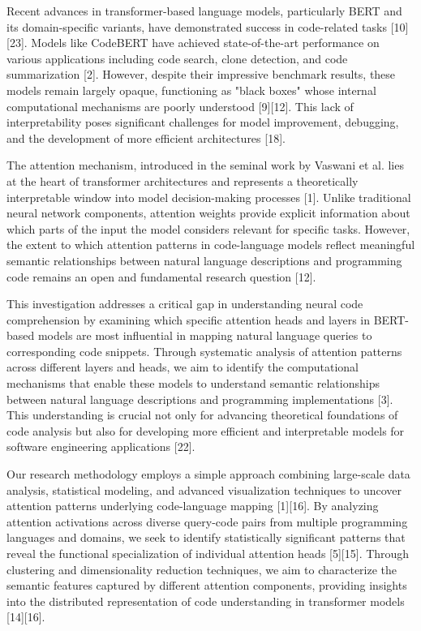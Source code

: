 \documentclass[conference]{IEEEtran}
\begin{document}
Recent advances in transformer-based language models, particularly BERT and its domain-specific variants, have demonstrated success in code-related tasks [10][23]. Models like CodeBERT have achieved state-of-the-art performance on various applications including code search, clone detection, and code summarization [2]. However, despite their impressive benchmark results, these models remain largely opaque, functioning as "black boxes" whose internal computational mechanisms are poorly understood [9][12]. This lack of interpretability poses significant challenges for model improvement, debugging, and the development of more efficient architectures [18].

The attention mechanism, introduced in the seminal work by Vaswani et al. lies at the heart of transformer architectures and represents a theoretically interpretable window into model decision-making processes [1]. Unlike traditional neural network components, attention weights provide explicit information about which parts of the input the model considers relevant for specific tasks. However, the extent to which attention patterns in code-language models reflect meaningful semantic relationships between natural language descriptions and programming code remains an open and fundamental research question [12].

This investigation addresses a critical gap in understanding neural code comprehension by examining which specific attention heads and layers in BERT-based models are most influential in mapping natural language queries to corresponding code snippets. Through systematic analysis of attention patterns across different layers and heads, we aim to identify the computational mechanisms that enable these models to understand semantic relationships between natural language descriptions and programming implementations [3]. This understanding is crucial not only for advancing theoretical foundations of code analysis but also for developing more efficient and interpretable models for software engineering applications [22].

Our research methodology employs a simple approach combining large-scale data analysis, statistical modeling, and advanced visualization techniques to uncover attention patterns underlying code-language mapping [1][16]. By analyzing attention activations across diverse query-code pairs from multiple programming languages and domains, we seek to identify statistically significant patterns that reveal the functional specialization of individual attention heads [5][15]. Through clustering and dimensionality reduction techniques, we aim to characterize the semantic features captured by different attention components, providing insights into the distributed representation of code understanding in transformer models [14][16].
\end{document}

